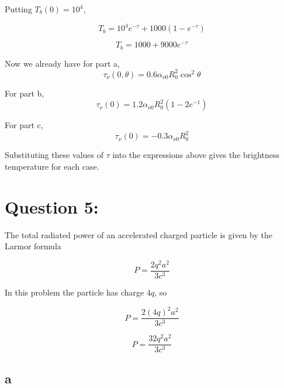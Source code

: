 \documentclass{article}
\begin{document}
Putting $T_b(0)=10^4$,

\begin{equation}
T_b = 10^4 e^{-\tau} + 1000(1-e^{-\tau})
\end{equation}

\begin{equation}
\boxed{
T_b = 1000 + 9000e^{-\tau}
}
\end{equation}
 

Now we already have for part a,
\begin{equation}
\tau_\nu(0,\theta)=0.6\alpha_{\nu0}R_0^2\cos^2\theta
\end{equation}


For part b,
\begin{equation}
\tau_\nu(0)=1.2\alpha_{\nu0}R_0^2(1-2e^{-1})
\end{equation}

For part c,
\begin{equation}
\tau_\nu(0)=-0.3\alpha_{\nu0}R_0^2
\end{equation}

Substituting these values of $\tau$ into the expressions above gives the brightness temperature for each case.




\section{Question 5:}

The total radiated power of an accelerated charged particle is given by the Larmor formula

\begin{equation}
P=\frac{2q^2a^2}{3c^3}
\end{equation}

In this problem the particle has charge $4q$, so

\begin{equation}
P=\frac{2(4q)^2a^2}{3c^3}
\end{equation}

\begin{equation}
P=\frac{32q^2a^2}{3c^3}
\end{equation}

\subsection{a}
\end{document}
